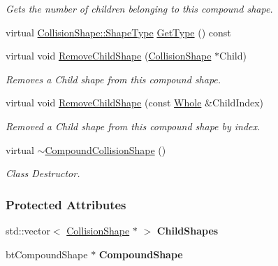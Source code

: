 \begin{DoxyCompactItemize}
\begin{DoxyCompactList}\small\item\em Gets the number of children belonging to this compound shape. \item\end{DoxyCompactList}\item 
virtual \hyperlink{classphys_1_1CollisionShape_af3ba4fd8af5b9557f912d2f5ff35a588}{CollisionShape::ShapeType} \hyperlink{classphys_1_1CompoundCollisionShape_a10bbe1a6ce849dc40e2ca5dc2b68cbff}{GetType} () const 
\item 
virtual void \hyperlink{classphys_1_1CompoundCollisionShape_a1c913ad531dc96c8e49ee08f4c9f09c3}{RemoveChildShape} (\hyperlink{classphys_1_1CollisionShape}{CollisionShape} $\ast$Child)
\begin{DoxyCompactList}\small\item\em Removes a Child shape from this compound shape. \item\end{DoxyCompactList}\item 
virtual void \hyperlink{classphys_1_1CompoundCollisionShape_ab95753e9fe72dfb570a565bfd6644ad8}{RemoveChildShape} (const \hyperlink{namespacephys_a460f6bc24c8dd347b05e0366ae34f34a}{Whole} \&ChildIndex)
\begin{DoxyCompactList}\small\item\em Removed a Child shape from this compound shape by index. \item\end{DoxyCompactList}\item 
\hypertarget{classphys_1_1CompoundCollisionShape_a6e97772fb1395554ca9e729c7fcc0a00}{
virtual \hyperlink{classphys_1_1CompoundCollisionShape_a6e97772fb1395554ca9e729c7fcc0a00}{$\sim$CompoundCollisionShape} ()}
\label{classphys_1_1CompoundCollisionShape_a6e97772fb1395554ca9e729c7fcc0a00}

\begin{DoxyCompactList}\small\item\em Class Destructor. \item\end{DoxyCompactList}\end{DoxyCompactItemize}
\subsubsection*{Protected Attributes}
\begin{DoxyCompactItemize}
\item 
\hypertarget{classphys_1_1CompoundCollisionShape_accc3f3f7dbf9dbc5fec69de718590f5e}{
std::vector$<$ \hyperlink{classphys_1_1CollisionShape}{CollisionShape} $\ast$ $>$ {\bfseries ChildShapes}}
\label{classphys_1_1CompoundCollisionShape_accc3f3f7dbf9dbc5fec69de718590f5e}

\item 
\hypertarget{classphys_1_1CompoundCollisionShape_a69262688643b8f83cbde52023074d725}{
btCompoundShape $\ast$ {\bfseries CompoundShape}}
\label{classphys_1_1CompoundCollisionShape_a69262688643b8f83cbde52023074d725}

\end{DoxyCompactItemize}


